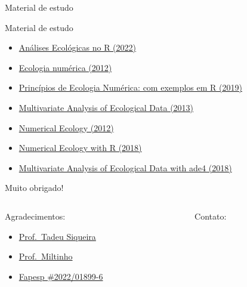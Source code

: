 \documentclass[
  ignorenonframetext,
]{beamer}
\providecommand{\tightlist}{%
  \setlength{\itemsep}{0pt}\setlength{\parskip}{0pt}}\usepackage{longtable,booktabs,array}
\begin{document}
\begin{frame}{Material de estudo}
\protect\hypertarget{material-de-estudo}{}
\begin{block}{Material de estudo}
\protect\hypertarget{material-de-estudo-1}{}
\begin{itemize}
\item
  \href{https://analises-ecologicas.com/}{Análises Ecológicas no R
  (2022)}
\item
  \href{https://www.travessa.com.br/ecologia-numerica-uma-introducao-a-analise-multivariada-de-dados-ecologicos-2-ed-2012/artigo/c19813c8-0c1d-4d56-8f63-86a90a90c02c}{Ecologia
  numérica (2012)}
\item
  \href{https://github.com/maurobio/econum}{Princípios de Ecologia
  Numérica: com exemplos em R (2019)}
\item
  \href{https://www.fbbva.es/microsite/multivariate-statistics/}{Multivariate
  Analysis of Ecological Data (2013)}
\item
  \href{http://www.numericalecology.com/indexen.html}{Numerical Ecology
  (2012)}
\item
  \href{http://www.numericalecology.com/numecolR/}{Numerical Ecology
  with R (2018)}
\item
  \href{https://lbbe.univ-lyon1.fr/en/annuaires-des-membres/thioulouse-jean}{Multivariate
  Analysis of Ecological Data with ade4 (2018)}
\end{itemize}
\end{block}

\begin{block}{Muito obrigado!}
\protect\hypertarget{muito-obrigado}{}
\begin{columns}[T]
\begin{column}{0.5\textwidth}
Agradecimentos:

\begin{itemize}
\tightlist
\item
  \href{https://tsiqueiralab.weebly.com/}{Prof.~Tadeu Siqueira}
\item
  \href{https://leec.eco.br/}{Prof.~Miltinho}
\item
  \href{https://bv.fapesp.br/pt/bolsas/203713/estrutura-da-paisagem-como-preditor-da-diversidade-taxonomica-e-funcional-de-anfibios-na-mata-atlant/}{Fapesp
  \#2022/01899-6}
\end{itemize}
\end{column}

\begin{column}{0.5\textwidth}
Contato:


\end{column}
\end{columns}
\end{block}
\end{frame}
\end{document}
